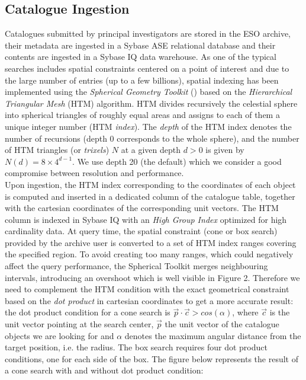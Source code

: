 \subsection{Catalogue Ingestion}
Catalogues submitted by principal investigators are stored in the ESO archive, their metadata are ingested in a Sybase ASE relational database and their contents are ingested in a Sybase IQ data warehouse. As one of the typical searches includes spatial constraints centered on a point of interest and due to the large number of entries (up to a few billions), spatial indexing has been implemented using the \textit{Spherical Geometry Toolkit} (\citet{spherical})
based on the \textit{Hierarchical Triangular Mesh} (HTM) algorithm. HTM divides recursively the celestial sphere into spherical triangles of roughly equal areas and assigns to each of them a unique integer number (HTM \textit{index}). The \textit{depth} of the HTM index denotes the number of recursions (depth 0 corresponds to the whole sphere), and the number of HTM triangles (or \textit{trixels}) $N$ at a given depth $d>0$ is given by $N(d) = 8\times{4^{d-1}}$. We use depth 20 (the default) which we consider a good compromise between resolution and performance.\\
Upon ingestion, the HTM index corresponding to the coordinates of each object is computed and inserted in a dedicated column of the catalogue table, together with the cartesian coordinates of the corresponding unit vectors. The HTM column is indexed in Sybase IQ with an \textit{High Group Index} optimized for high cardinality data. At query time, the spatial constraint (cone or box search) provided by the archive user is converted to a set of HTM index ranges covering the specified region. To avoid creating too many ranges, which could negatively affect the query performance, the Spherical Toolkit merges neighbouring intervals, introducing an overshoot which is well visible in Figure 2. Therefore we need to complement the HTM condition with the exact geometrical constraint based on the \textit{dot product} in cartesian coordinates to get a more accurate result: the dot product condition for a cone search is $\vec{p}\cdot\vec{c}>cos(\alpha)$, where $\vec{c}$ is the unit vector pointing at the search center, $\vec{p}$ the unit vector of the catalogue objects we are looking for and $\alpha$ denotes the maximum angular distance from the target position, i.e. the radius. The box search requires four dot product conditions, one for each side of the box. The figure below represents the result of a cone search with and without dot product condition:\\

